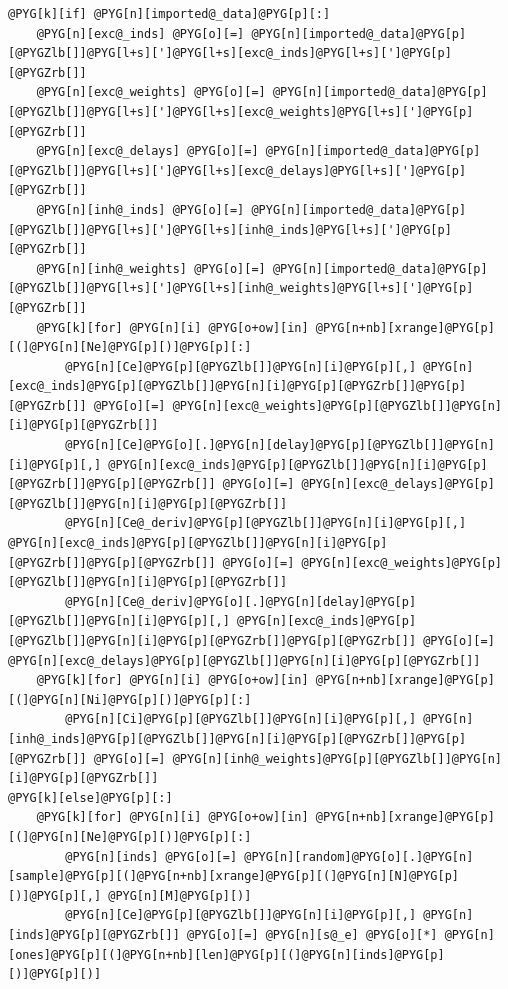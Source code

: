 \documentclass[letterpaper,10pt,english]{manual}
\begin{document}
\begin{Verbatim}[commandchars=@\[\]]
@PYG[k][if] @PYG[n][imported@_data]@PYG[p][:]
    @PYG[n][exc@_inds] @PYG[o][=] @PYG[n][imported@_data]@PYG[p][@PYGZlb[]]@PYG[l+s][']@PYG[l+s][exc@_inds]@PYG[l+s][']@PYG[p][@PYGZrb[]]
    @PYG[n][exc@_weights] @PYG[o][=] @PYG[n][imported@_data]@PYG[p][@PYGZlb[]]@PYG[l+s][']@PYG[l+s][exc@_weights]@PYG[l+s][']@PYG[p][@PYGZrb[]]
    @PYG[n][exc@_delays] @PYG[o][=] @PYG[n][imported@_data]@PYG[p][@PYGZlb[]]@PYG[l+s][']@PYG[l+s][exc@_delays]@PYG[l+s][']@PYG[p][@PYGZrb[]]
    @PYG[n][inh@_inds] @PYG[o][=] @PYG[n][imported@_data]@PYG[p][@PYGZlb[]]@PYG[l+s][']@PYG[l+s][inh@_inds]@PYG[l+s][']@PYG[p][@PYGZrb[]]
    @PYG[n][inh@_weights] @PYG[o][=] @PYG[n][imported@_data]@PYG[p][@PYGZlb[]]@PYG[l+s][']@PYG[l+s][inh@_weights]@PYG[l+s][']@PYG[p][@PYGZrb[]]
    @PYG[k][for] @PYG[n][i] @PYG[o+ow][in] @PYG[n+nb][xrange]@PYG[p][(]@PYG[n][Ne]@PYG[p][)]@PYG[p][:]
        @PYG[n][Ce]@PYG[p][@PYGZlb[]]@PYG[n][i]@PYG[p][,] @PYG[n][exc@_inds]@PYG[p][@PYGZlb[]]@PYG[n][i]@PYG[p][@PYGZrb[]]@PYG[p][@PYGZrb[]] @PYG[o][=] @PYG[n][exc@_weights]@PYG[p][@PYGZlb[]]@PYG[n][i]@PYG[p][@PYGZrb[]]
        @PYG[n][Ce]@PYG[o][.]@PYG[n][delay]@PYG[p][@PYGZlb[]]@PYG[n][i]@PYG[p][,] @PYG[n][exc@_inds]@PYG[p][@PYGZlb[]]@PYG[n][i]@PYG[p][@PYGZrb[]]@PYG[p][@PYGZrb[]] @PYG[o][=] @PYG[n][exc@_delays]@PYG[p][@PYGZlb[]]@PYG[n][i]@PYG[p][@PYGZrb[]]
        @PYG[n][Ce@_deriv]@PYG[p][@PYGZlb[]]@PYG[n][i]@PYG[p][,] @PYG[n][exc@_inds]@PYG[p][@PYGZlb[]]@PYG[n][i]@PYG[p][@PYGZrb[]]@PYG[p][@PYGZrb[]] @PYG[o][=] @PYG[n][exc@_weights]@PYG[p][@PYGZlb[]]@PYG[n][i]@PYG[p][@PYGZrb[]]
        @PYG[n][Ce@_deriv]@PYG[o][.]@PYG[n][delay]@PYG[p][@PYGZlb[]]@PYG[n][i]@PYG[p][,] @PYG[n][exc@_inds]@PYG[p][@PYGZlb[]]@PYG[n][i]@PYG[p][@PYGZrb[]]@PYG[p][@PYGZrb[]] @PYG[o][=] @PYG[n][exc@_delays]@PYG[p][@PYGZlb[]]@PYG[n][i]@PYG[p][@PYGZrb[]]
    @PYG[k][for] @PYG[n][i] @PYG[o+ow][in] @PYG[n+nb][xrange]@PYG[p][(]@PYG[n][Ni]@PYG[p][)]@PYG[p][:]
        @PYG[n][Ci]@PYG[p][@PYGZlb[]]@PYG[n][i]@PYG[p][,] @PYG[n][inh@_inds]@PYG[p][@PYGZlb[]]@PYG[n][i]@PYG[p][@PYGZrb[]]@PYG[p][@PYGZrb[]] @PYG[o][=] @PYG[n][inh@_weights]@PYG[p][@PYGZlb[]]@PYG[n][i]@PYG[p][@PYGZrb[]]
@PYG[k][else]@PYG[p][:]
    @PYG[k][for] @PYG[n][i] @PYG[o+ow][in] @PYG[n+nb][xrange]@PYG[p][(]@PYG[n][Ne]@PYG[p][)]@PYG[p][:]
        @PYG[n][inds] @PYG[o][=] @PYG[n][random]@PYG[o][.]@PYG[n][sample]@PYG[p][(]@PYG[n+nb][xrange]@PYG[p][(]@PYG[n][N]@PYG[p][)]@PYG[p][,] @PYG[n][M]@PYG[p][)]
        @PYG[n][Ce]@PYG[p][@PYGZlb[]]@PYG[n][i]@PYG[p][,] @PYG[n][inds]@PYG[p][@PYGZrb[]] @PYG[o][=] @PYG[n][s@_e] @PYG[o][*] @PYG[n][ones]@PYG[p][(]@PYG[n+nb][len]@PYG[p][(]@PYG[n][inds]@PYG[p][)]@PYG[p][)]

\end{Verbatim}
\end{document}
